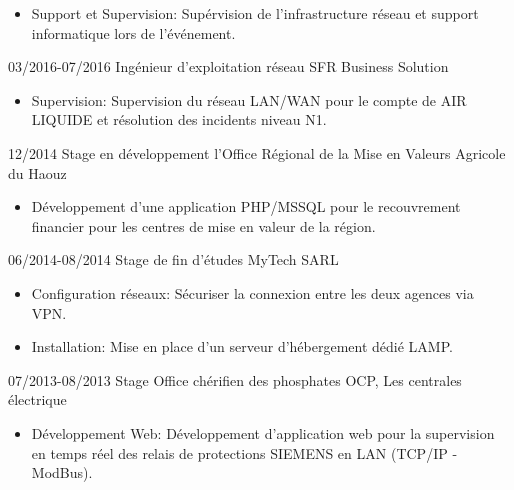 \documentclass[9pt]{developercv} %
\begin{document}
\begin{entrylist}
{\begin{itemize}[noitemsep,topsep=0pt,parsep=0pt,partopsep=0pt, leftmargin=-1pt]
            \item Support et Supervision: Supérvision de l’infrastructure réseau et support informatique lors de l’événement.
        \end{itemize}
        }
	\entry
        {03/2016-07/2016}
		{Ingénieur d’exploitation réseau}
		{SFR Business Solution}
		{\vspace{-10pt}
        \begin{itemize}[noitemsep,topsep=0pt,parsep=0pt,partopsep=0pt, leftmargin=-1pt]
            \item Supervision: Supervision du réseau LAN/WAN pour le compte de AIR LIQUIDE et résolution des incidents niveau N1.
        \end{itemize}
        }
	\entry
        {12/2014}
		{Stage en développement}
		{l’Office Régional de la Mise en Valeurs Agricole du Haouz}
		{\vspace{-10pt}
        \begin{itemize}[noitemsep,topsep=0pt,parsep=0pt,partopsep=0pt, leftmargin=-1pt]
            \item Développement d’une application PHP/MSSQL pour le recouvrement financier pour les
            centres de mise en valeur de la région.
        \end{itemize}
        }
	\entry
        {06/2014-08/2014}
		{Stage de fin d'études}
		{MyTech SARL}
		{\vspace{-10pt}
        \begin{itemize}[noitemsep,topsep=0pt,parsep=0pt,partopsep=0pt, leftmargin=-1pt]
            \item Configuration réseaux: Sécuriser la connexion entre les deux agences via VPN.
            \item Installation: Mise en place d’un serveur d’hébergement dédié LAMP.
        \end{itemize}
        }
	\entry
        {07/2013-08/2013}
		{Stage}
		{Office chérifien des phosphates OCP, Les centrales électrique}
		{\vspace{-10pt}
        \begin{itemize}[noitemsep,topsep=0pt,parsep=0pt,partopsep=0pt, leftmargin=-1pt]
            \item Développement Web: Développement d’application web pour la supervision en temps réel des relais de
            protections SIEMENS en LAN (TCP/IP - ModBus).
        \end{itemize}
}
\end{entrylist}
\end{document}
